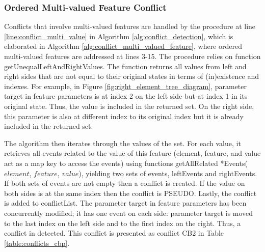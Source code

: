 \subsubsection{Ordered Multi-valued Feature Conflict} 
\label{sec:ordered_conflict}
Conflicts that involve multi-valued features are handled by the procedure at line \ref{line:conflict_multi_value} in Algorithm \ref{alg:conflict_detection}, which is elaborated in Algorithm \ref{alg:conflict_multi_valued_feature}, where ordered multi-valued features are addressed at lines 3-15. The procedure relies on function \textsf{getUnequalLeftAndRightValues}. The function returns all values from left and right sides that are not equal to their original states in terms of (in)existence and indexes. For example, in Figure \ref{fig:right_element_tree_diagram}, parameter \textsf{target} in feature \textsf{parameters} is at index 2 on the left side but at index 1 in its original state. Thus, the value is included in the returned set. On the right side, this parameter is also at different index to its original index but it is already included in the returned set. 

The algorithm then iterates through the values of the set. For each value, it retrieves all events related to the value of this feature (element, feature, and value act as a map key to access the events) using functions \textsf{getAllRelated *Events($element$, $feature$, $value$)}, yielding two sets of events, \textsf{leftEvents} and \textsf{rightEvents}. If both sets of events are not empty then a conflict is created. If the value on both sides is at the same index then the conflict is \textsf{PSEUDO}. Lastly, the conflict is added to \textsf{conflictList}. The parameter \textsf{target} in feature \textsf{parameters} has been concurrently modified; it has one event on each side: parameter \textsf{target} is moved to the last index on the left side and to the first index on the right. Thus, a conflict in detected. This conflict is presented as conflict \textsf{CB2} in Table \ref{table:conflicts_cbp}.


